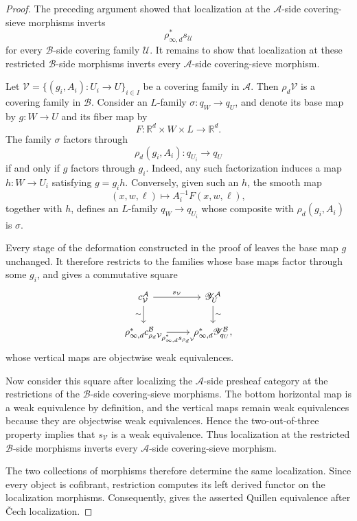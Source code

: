 \documentclass{amsart}
\newcommand{\RR}{{\mathbb{R}}}
\newcommand{\Yo}{\mathscr{Y}}
\theoremstyle{definition}
\numberwithin{equation}{subsection}
\numberwithin{subsubsection}{subsection}
\begin{document}
\begin{proof}
  The
  preceding argument showed that localization at the \(\mathcal{A}\)-side
  covering-sieve morphisms inverts
  \[
    \rho_{\infty,d}^{*}s_{\mathcal{U}}
  \]
  for every \(\mathcal{B}\)-side covering family \(\mathcal{U}\). It remains
  to show that localization at these restricted \(\mathcal{B}\)-side
  morphisms inverts every \(\mathcal{A}\)-side covering-sieve morphism.

  Let
  \(\mathcal{V}=\{(g_i,A_i):U_i\to U\}_{i\in I}\) be a covering family in
  \(\mathcal{A}\). Then \(\rho_d\mathcal{V}\) is a covering family in
  \(\mathcal{B}\). Consider an \(L\)-family \(\sigma:q_W\to q_U\), and
  denote its base map by \(g:W\to U\) and its fiber map by
  \[
    F:\RR^d\times W\times L\longrightarrow\RR^d.
  \]
  The family \(\sigma\) factors through
  \[
    \rho_d(g_i,A_i):q_{U_i}\longrightarrow q_U
  \]
  if and only if \(g\) factors through \(g_i\). Indeed, any such
  factorization induces a map \(h:W\to U_i\) satisfying \(g=g_i h\).
  Conversely, given such an \(h\), the smooth map
  \[
    (x,w,\ell)\longmapsto A_i^{-1}F(x,w,\ell),
  \]
  together with \(h\), defines an \(L\)-family \(q_W\to q_{U_i}\) whose
  composite with \(\rho_d(g_i,A_i)\) is \(\sigma\).

  Every stage of the deformation constructed in the proof of
   leaves the base map \(g\) unchanged. It
  therefore restricts to the families whose base maps factor through some
  \(g_i\), and gives a commutative square
  \[
    \begin{tikzcd}
      c_{\mathcal{V}}^{\mathcal{A}}
      \ar[r,"s_{\mathcal{V}}"]
      \ar[d,"\sim"']
      &
      \Yo_U^{\mathcal{A}}
      \ar[d,"\sim"]
      \\
      \rho_{\infty,d}^{*}c_{\rho_d\mathcal{V}}^{\mathcal{B}}
      \ar[r,"\rho_{\infty,d}^{*}s_{\rho_d\mathcal{V}}"']
      &
      \rho_{\infty,d}^{*}\Yo_{q_U}^{\mathcal{B}},
    \end{tikzcd}
  \]
  whose vertical maps are objectwise weak equivalences.

  Now consider this square after localizing the \(\mathcal{A}\)-side
  presheaf category at the restrictions of the \(\mathcal{B}\)-side
  covering-sieve morphisms. The bottom horizontal map is a weak equivalence
  by definition, and the vertical maps remain weak equivalences because they
  are objectwise weak equivalences. Hence the two-out-of-three property
  implies that \(s_{\mathcal{V}}\) is a weak equivalence. Thus localization
  at the restricted \(\mathcal{B}\)-side morphisms inverts every
  \(\mathcal{A}\)-side covering-sieve morphism.

  The two collections of morphisms therefore determine the same
  localization. Since every object is cofibrant, restriction computes its
  left derived functor on the localization morphisms. Consequently,
  \cite[Theorem~3.3.20]{Hir03} gives the asserted Quillen equivalence after
  \v{C}ech localization.
\end{proof}
\end{document}
